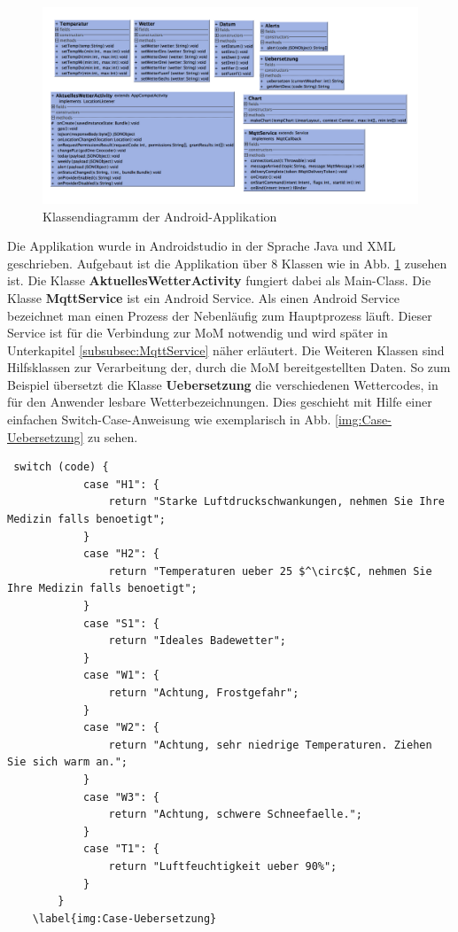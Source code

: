 \begin{figure}[htbp]
	\centering
	\includegraphics[width=1.0\textwidth]{Bilder/AndroidUML.png}
	\caption{Klassendiagramm der Android-Applikation}
	\label{img:AndroidUMLDiagramm}
\end{figure} 
Die Applikation wurde in Androidstudio in der Sprache Java und XML geschrieben. 
Aufgebaut ist die Applikation über 8 Klassen wie in  Abb. \ref{img:AndroidUMLDiagramm} zusehen ist. Die Klasse \textbf{AktuellesWetterActivity} fungiert dabei als Main-Class.
Die Klasse \textbf{MqttService} ist ein Android Service. Als einen Android Service bezeichnet man einen Prozess der Nebenläufig zum Hauptprozess läuft. Dieser Service ist für die Verbindung zur MoM notwendig und wird später in Unterkapitel \ref{subsubsec:MqttService} näher erläutert.
Die Weiteren Klassen sind Hilfsklassen zur Verarbeitung der, durch die MoM bereitgestellten Daten.
So zum Beispiel übersetzt die Klasse \textbf{Uebersetzung} die verschiedenen Wettercodes, in für den Anwender lesbare Wetterbezeichnungen. Dies geschieht mit Hilfe einer einfachen Switch-Case-Anweisung wie exemplarisch in Abb. \ref{img:Case-Uebersetzung} zu sehen.
  \begin{lstlisting}
 switch (code) {
            case "H1": {
                return "Starke Luftdruckschwankungen, nehmen Sie Ihre Medizin falls benoetigt";
            }
            case "H2": {
                return "Temperaturen ueber 25 $^\circ$C, nehmen Sie Ihre Medizin falls benoetigt";
            }
            case "S1": {
                return "Ideales Badewetter";
            }
            case "W1": {
                return "Achtung, Frostgefahr";
            }
            case "W2": {
                return "Achtung, sehr niedrige Temperaturen. Ziehen Sie sich warm an.";
            }
            case "W3": {
                return "Achtung, schwere Schneefaelle.";
            }
            case "T1": {
                return "Luftfeuchtigkeit ueber 90%";
            }
        }
	\label{img:Case-Uebersetzung}
\end{lstlisting} 

